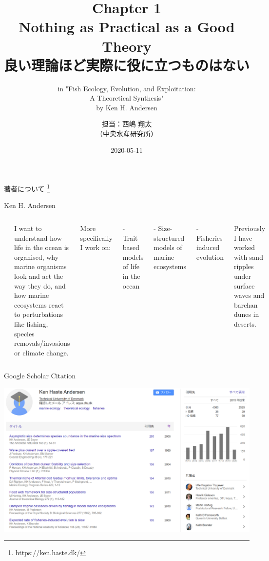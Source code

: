 \documentclass[
  ignorenonframetext,
]{beamer}
\title{Chapter 1\\
Nothing as Practical as a Good Theory\\
良い理論ほど実際に役に立つものはない}
\subtitle{in "Fish Ecology, Evolution, and Exploitation:\\
A Theoretical Synthesis"\\
by Ken H. Andersen}
\author{担当：西嶋 翔太\\
（中央水産研究所）}
\date{2020-05-11}
\newcommand{\vspacesmall}{\vspace{3mm}}
\begin{document}
\frame{\titlepage}

\begin{frame}{著者について \footnote[frame]{https://ken.haste.dk/}}
\protect\hypertarget{ux8457ux8005ux306bux3064ux3044ux3066}{}

\begin{block}{Ken H. Andersen}

\begin{columns}


\includegraphics[width=100px]{KenAndersen} 


I want to understand how life in the ocean is organised, why marine organisms look and act the way they do, and how marine ecosystems react to perturbations like  fishing, species removals/invasions or climate change.  
  
\vspacesmall
More specifically I work on:  

- Trait-based models of life in the ocean  

- Size-structured models of marine ecosystems  

- Fisheries induced  evolution  
  
\vspacesmall
Previously I have worked with sand ripples under surface waves and barchan dunes in deserts.

\end{columns}

\end{block}

\end{frame}

\begin{frame}{Google Scholar Citation}
\protect\hypertarget{google-scholar-citation}{}

\begin{center}\includegraphics[width=1.05\linewidth]{GoogleScholarCitation} \end{center}

\end{frame}
\end{document}

